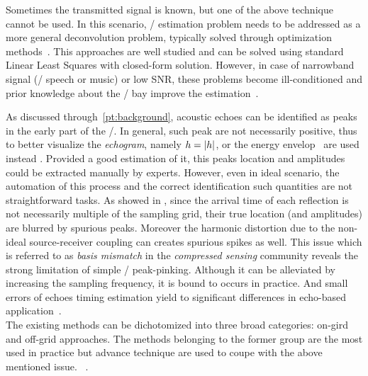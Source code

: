 \mynewline
Sometimes the transmitted signal is known, but one of the above technique cannot be used.
In this scenario, \RIR/ estimation problem needs to be addressed as a more general deconvolution problem, typically solved through optimization methods~.
This approaches are well studied and can be solved using standard Linear Least Squares with closed-form solution.
However, in case of narrowband signal (\eg/ speech or music) or low SNR, these problems become ill-conditioned and prior knowledge about the \RIR/ bay improve the estimation~.

As discussed through~\cref{pt:background}, acoustic echoes can be identified as peaks in the early part of the \RIR/.
In general, such peak are not necessarily positive, thus to better visualize the \textit{echogram}, namely $h = |{h}|$, or the energy envelop~ are used instead%
.
Provided a good estimation of it, this peaks location and amplitudes could be extracted manually by experts.
However, even in ideal scenario, the automation of this process and the correct identification such quantities are not straightforward tasks.
As showed in , since the arrival time of each reflection is not necessarily multiple of the sampling grid, their true location (and amplitudes) are blurred by spurious peaks.
Moreover the harmonic distortion due to the non-ideal source-receiver coupling can creates spurious spikes as well.
This issue which is referred to as \textit{basis mismatch} in the \textit{compressed sensing} community reveals the strong limitation of simple \RIR/ peak-pinking.
Although it can be alleviated by increasing the sampling frequency, it is bound to occurs in practice.
And small errors of echoes timing estimation yield to significant differences in echo-based application~.
\\The existing methods can be dichotomized into three broad categories: on-gird and off-grid approaches.
The methods belonging to the former group are the most used in practice but advance technique are used to coupe with the above mentioned issue.
~.
